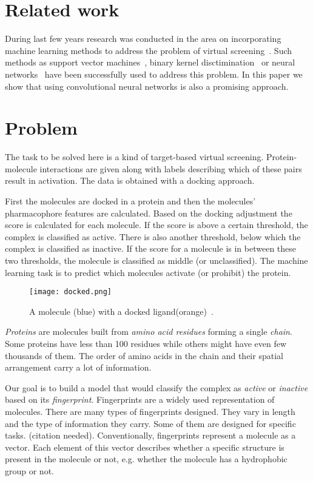 \documentclass[a4paper,10pt]{report}
\begin{document}
    \section{Related work}
    During last few years research was conducted in the area on incorporating machine learning methods to address the problem of virtual screening~\cite{kernel_biology, evaluation2007, MLforINSilicio}. Such methods as support vector machines~\cite{SVM}, binary kernel disctimination~\cite{BKD} or neural networks~\cite{NN_VS} have been successfully used to address this problem. In this paper we show that using convolutional neural networks is also a promising approach.

    \section{Problem}\label{sec:PROBLEM}
    The task to be solved here is a kind of target-based virtual screening. Protein-molecule interactions are given along with labels describing which of these pairs result in activation. The data is obtained with a docking approach.
    
    First the molecules are docked in a protein and then the molecules' pharmacophore features are calculated. Based on the docking adjustment the score is calculated for each molecule. If the score is above a certain threshold, the complex is classified as active. There is also another threshold, below which the complex is classified as inactive. If the score for a molecule is in between these two thresholds, the molecule is classified as middle (or unclassified). The machine learning task is to predict which molecules activate (or prohibit) the protein.
    
    \begin{figure}[h!]
	  \centering
	  \texttt{[image: docked.png]}
	  \caption{A molecule (blue) with a docked ligand(orange)~\cite{docked}.}
	  \label{docked}
    \end{figure} 
    
    \emph{Proteins} are molecules built from \emph{amino acid residues} forming a single \emph{chain}. Some proteins have less than 100 residues while others might have even few thousands of them. The order of amino acids in the chain and their spatial arrangement carry a lot of information. 
    
    Our goal is to build a model that would classify the complex as \emph{active} or \emph{inactive} based on its \emph{fingerprint}. Fingerprints are a widely used representation of molecules. There are many types of fingerprints designed. They vary in length and the type of information they carry. Some of them are designed for specific tasks. (citation needed). Conventionally, fingerprints represent a molecule as a vector. Each element of this vector describes whether a specific structure is present in the molecule or not, e.g. whether the molecule has a hydrophobic group or not. 
        
\end{document}
